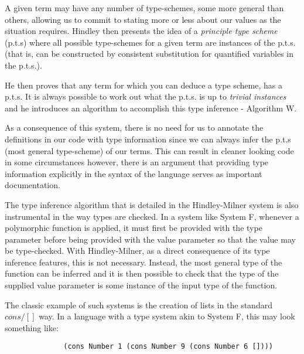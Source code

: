             A given term may have any number of
            type-schemes, some more general than others,
            allowing us to commit to stating more or less about our
            values as the situation requires. Hindley then presents
            the idea of a \textit{principle type scheme} (p.t.s) where
            all possible type-schemes for a given term are instances
            of the p.t.s. (that is, can be constructed by consistent
            substitution for quantified variables in the p.t.s.).
            
            He then proves that any term for which you can deduce a type scheme,
            has a p.t.s. It is always possible to work out what the p.t.s. is
            up to \textit{trivial instances} and he introduces an
            algorithm to accomplish this type inference - Algorithm W.

            As a consequence of this system, there is no need for us to
            annotate the definitions in our code with type
            information since we can always infer the p.t.s (most
            general type-scheme) of our terms. This can result
            in cleaner looking code in some circumstances however,
            there is an argument that providing type information
            explicitly in the syntax of the language serves as
            important documentation.
            
            The type inference algorithm that is detailed in the Hindley-Milner
            system is also instrumental in the way types are checked.         
            In a system like System F, whenever a polymorphic
            function is applied, it must first be provided with the type
            parameter before being provided with
            the value parameter so that the value may be
            type-checked. With Hindley-Milner, as a direct consequence
            of its type inference features, this is not
            necessary. Instead, the
            most general type of the function can be inferred and it
            is then possible to check that the type of the supplied
            value parameter is some instance of the input type of the function.
            
            The classic example of such systems is the creation of lists in the
            standard $cons/[]$ way. In a language with a type system akin to
            System F, this may look
            something like:
            
            \begin{verbatim}
              (cons Number 1 (cons Number 9 (cons Number 6 [])))  
            \end{verbatim}
            
